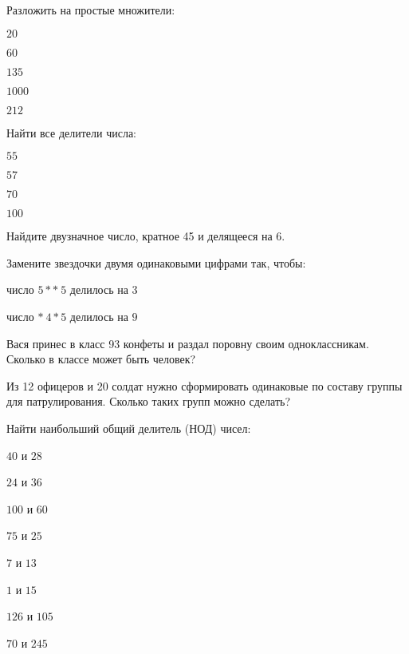 \begin{listofex}
	\item Разложить на простые множители:
	\begin{enumcols}[itemcolumns=5]
		\item \( 20 \)
		\item \( 60 \)
		\item \( 135 \)
		\item \( 1000 \)
		\item \( 212 \)
	\end{enumcols}
	\item Найти все делители числа:
	\begin{enumcols}[itemcolumns=4]
		\item \( 55 \)
		\item \( 57 \)
		\item \( 70 \)
		\item \( 100 \)
	\end{enumcols}
	\item Найдите двузначное число, кратное 45 и делящееся на 6.
	\item Замените звездочки двумя одинаковыми цифрами так, чтобы:
	\begin{enumcols}[itemcolumns=2]
		\item число \( 5**\:5 \) делилось на \( 3 \)
		\item число \( *\:4*5 \) делилось на \( 9 \)
	\end{enumcols}
	\item Вася принес в класс 93 конфеты и раздал поровну своим одноклассникам. Сколько в классе может быть человек?
	\item Из 12 офицеров и 20 солдат нужно сформировать одинаковые по составу группы для патрулирования. Сколько таких групп можно сделать?
	\item Найти наибольший общий делитель (НОД) чисел:
	\begin{enumcols}[itemcolumns=4]
		\item \( 40 \) и \( 28 \)
		\item \( 24 \) и \( 36 \)
		\item \( 100 \) и \( 60 \)
		\item \( 75 \) и \( 25 \)
		\item \( 7 \) и \( 13 \)
		\item \( 1 \) и \( 15 \)
		\item \( 126 \) и \( 105 \)
		\item \( 70 \) и \( 245 \)

\end{enumcols}
\end{listofex}
